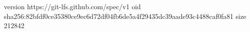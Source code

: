 version https://git-lfs.github.com/spec/v1
oid sha256:82bfdf0ce35380ce9ec6d72df04fb6de5a4f29435dc39aade93c4488caf0fa81
size 212842
